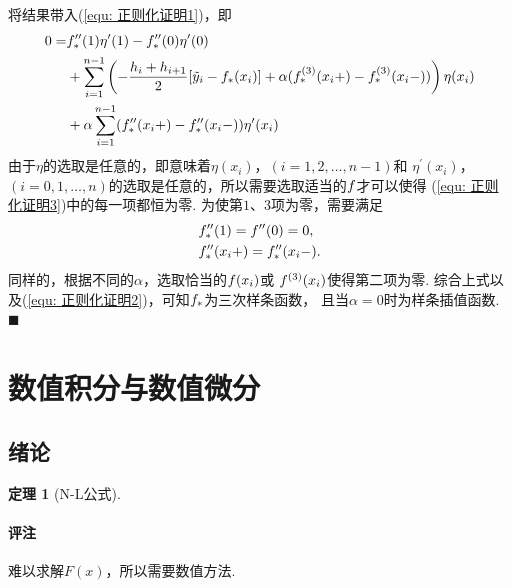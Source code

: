 \documentclass[12pt, a4paper]{article}
\theoremstyle{margin}
\newtheorem{thm}{定理}
\newcommand{\pr}{\prime}
\newcommand{\hp}{^\prime}
\newcommand{\f}{\mathnormal{f}}
\newcommand\equref[1]{(\ref{#1})}
\newcommand{\remark}{\paragraph{评注}}
\begin{document}
    将结果带入\equref{equ: 正则化证明1}，即
    \begin{equation}\begin{split}
      \label{equ: 正则化证明3}
      0 =&
      \f_*^{\pr\pr}(1)\eta\hp(1) - \f_*^{\pr\pr}(0)\eta\hp(0)\\
      &+\sum_{i=1}^{n-1} \left(
        -\frac{h_i+h_{i+1}}{2}[\tilde{y}_i - \f_*(x_i)]
        + \alpha(\f_*^{(3)}(x_i+) - \f_*^{(3)}(x_i-))
      \right)\eta(x_i) \\
      &+\alpha\sum_{i=1}^{n-1} ( \f_*^{\pr\pr}(x_i+) - \f_*^{\pr\pr}(x_i-))\eta\hp(x_i)
    \end{split}\end{equation}
    由于$\eta$的选取是任意的，即意味着$\eta(x_i)$，$(i=1,2,\dots,n-1)$和
    $\eta\hp(x_i)$，$(i=0,1,\dots,n)$的选取是任意的，所以需要选取适当的$\f$才可以使得
    \equref{equ: 正则化证明3}中的每一项都恒为零. 为使第$1$、$3$项为零，需要满足
    \[\begin{split}
      & \f_*^{\pr\pr}(1) = \f^{\pr\pr}(0) = 0,\\
      & \f_*^{\pr\pr}(x_i+) = \f_*^{\pr\pr}(x_i-).
    \end{split}\]
    同样的，根据不同的$\alpha$，选取恰当的$\f(x_i)$或
    $\f^{(3)}(x_i)$使得第二项为零.
    综合上式以及\equref{equ: 正则化证明2}，可知$\f_*$为三次样条函数，
    且当$\alpha=0$时为样条插值函数. $\blacksquare$

\iffalse
\newpage
\section{数值积分与数值微分}
\subsection{绪论}
  \begin{thm}[N-L公式]
  \end{thm}
  \remark
    难以求解$F(x)$，所以需要数值方法.
\end{document}
